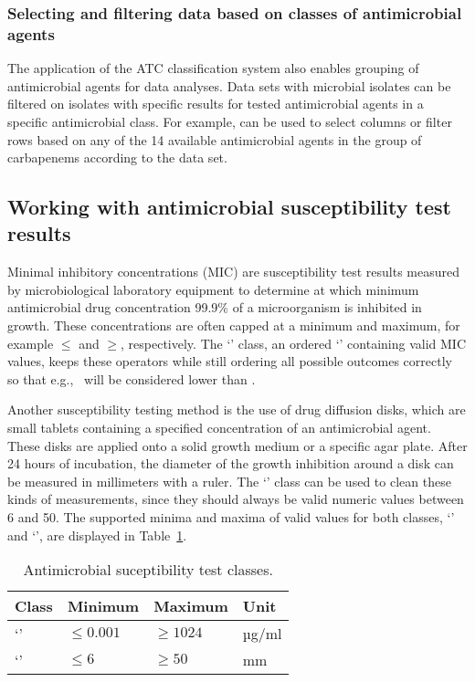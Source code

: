 \documentclass[article, shortnames]{jss}
\newcommand{\class}[1]{`\code{#1}'}
\begin{document}
\subsubsection{Selecting and filtering data based on classes of antimicrobial agents}

The application of the ATC classification system also enables grouping of
antimicrobial agents for data analyses.  Data sets with microbial isolates
can be filtered on isolates with specific results for tested antimicrobial
agents in a specific antimicrobial class.  For example, 
can be used to select columns or filter rows based on any of the 14 available
antimicrobial agents in the group of carbapenems according to the
 data set.

\subsection{Working with antimicrobial susceptibility test results}

Minimal inhibitory concentrations (MIC) are susceptibility test results
measured by microbiological laboratory equipment to determine at which
minimum antimicrobial drug concentration 99.9\% of a microorganism is
inhibited in growth.  These concentrations are often capped at a minimum and
maximum, for example $\leq$ and $\geq$,
respectively.  The \class{mic} class, an ordered \class{factor} containing
valid MIC values, keeps these operators while still ordering all possible
outcomes correctly so that e.g.,~ will be considered lower
than .

Another susceptibility testing method is the use of drug diffusion disks,
which are small tablets containing a specified concentration of an
antimicrobial agent.  These disks are applied onto a solid growth medium or
a specific agar plate.  After 24 hours of incubation, the diameter of the
growth inhibition around a disk can be measured in millimeters with a ruler. 
The \class{disk} class can be used to clean these kinds of measurements,
since they should always be valid numeric values between 6 and 50.  The
supported minima and maxima of valid values for both classes, \class{mic}
and \class{disk}, are displayed in Table~\ref{tab:susceptclasses}.
%
\begin{table}[t!]
\centering
\begin{tabular}{llll}
\hline
Class & Minimum & Maximum & Unit \\ 
\hline
\class{mic}  & $\leq 0.001$ & $\geq 1024$ & µg/ml \\
\class{disk} & $\leq 6$ & $\geq 50$ & mm \\ 
\hline
\end{tabular}
\caption{Antimicrobial suceptibility test classes.}
\label{tab:susceptclasses}
\end{table}
%
\end{document}
